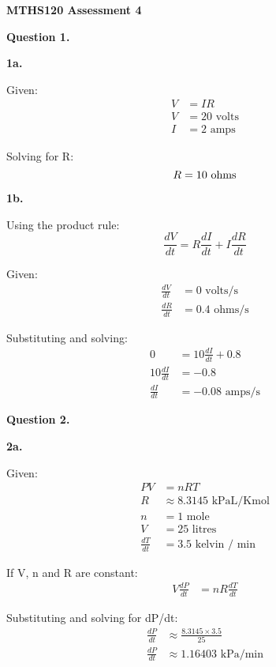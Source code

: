 \documentclass[12pt,a4paper]{report}
\begin{document}
\textbf{MTHS120 Assessment 4}

\textbf{Question 1.}

\textbf{1a.}

Given:
\begin{align}
V &= IR \\
V &= 20\text{ volts} \\
I &= 2\text{ amps}
\end{align}

Solving for R:
\begin{equation}
R = 10\text{ ohms} \\
\end{equation}

\textbf{1b.}

Using the product rule:
\begin{equation}
\frac{dV}{dt}=R\frac{dI}{dt} + I\frac{dR}{dt}
\end{equation}

Given:
\begin{align}
\frac{dV}{dt} &= 0\text{ volts/s} \\
\frac{dR}{dt} &= 0.4 \text{ ohms/s}
\end{align}

Substituting and solving:
\begingroup
\addtolength{\jot}{0.5em}
\begin{align}
0 &=10\frac{dI}{dt} + 0.8 \\
10\frac{dI}{dt} &= -0.8 \\
\frac{dI}{dt} &= -0.08 \text{ amps/s}
\end{align}
\endgroup

\newpage

\textbf{Question 2.}

\textbf{2a.}

Given:
\begingroup
\addtolength{\jot}{0.5em}
\begin{align}
PV &= nRT \\
R &\approx 8.3145 \text{ kPaL/Kmol} \\
n &= 1\text{ mole} \\
V &= 25\text{ litres} \\
\frac{dT}{dt} &= 3.5\text{ kelvin / min} 
\end{align}
\endgroup

If V, n and R are constant:
\begingroup
\addtolength{\jot}{0.5em}
\begin{align}
V\frac{dP}{dt} &= nR\frac{dT}{dt}
\end{align}
\endgroup

Substituting and solving for dP/dt:
\begingroup
\addtolength{\jot}{0.5em}
\begin{align}
\frac{dP}{dt} &\approx \frac{8.3145 \times 3.5}{25} \\
\frac{dP}{dt} &\approx 1.16403 \text{ kPa/min}
\end{align}
\endgroup
\end{document}
